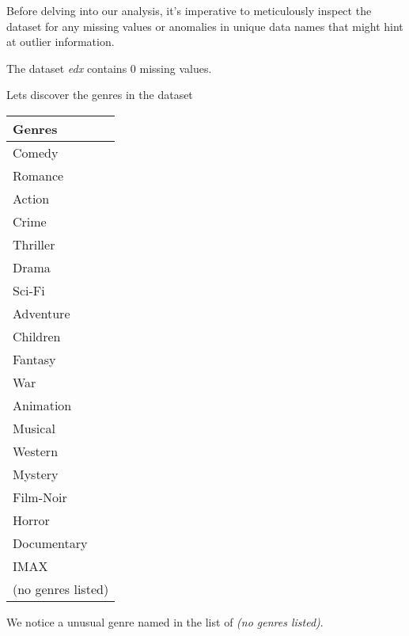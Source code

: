 \documentclass[
]{article}
\begin{document}
\newpage

Before delving into our analysis, it's imperative to meticulously
inspect the dataset for any missing values or anomalies in unique data
names that might hint at outlier information.

The dataset \emph{edx} contains 0 missing values.

Lets discover the genres in the dataset

\begin{center}


\begin{tabular}{l}
\hline
Genres\\
\hline
Comedy\\
\hline
Romance\\
\hline
Action\\
\hline
Crime\\
\hline
Thriller\\
\hline
Drama\\
\hline
Sci-Fi\\
\hline
Adventure\\
\hline
Children\\
\hline
Fantasy\\
\hline
War\\
\hline
Animation\\
\hline
Musical\\
\hline
Western\\
\hline
Mystery\\
\hline
Film-Noir\\
\hline
Horror\\
\hline
Documentary\\
\hline
IMAX\\
\hline
(no genres listed)\\
\hline
\end{tabular}

 
\end{center}

We notice a unusual genre named in the list of \emph{(no genres
listed)}.
\end{document}
